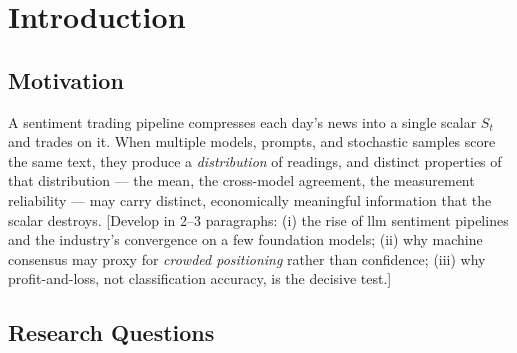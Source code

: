 %
%
%
\chapter{Introduction}
\label{ch:introduction}

\section{Motivation}
\label{sec:motivation}

A sentiment trading pipeline compresses each day's news into a single
scalar $S_t$ and trades on it. When multiple models, prompts, and
stochastic samples score the same text, they produce a
\emph{distribution} of readings, and distinct properties of that
distribution --- the mean, the cross-model agreement, the measurement
reliability --- may carry distinct, economically meaningful
information that the scalar destroys. [Develop in 2--3 paragraphs:
(i) the rise of \gls{llm} sentiment pipelines and the industry's
convergence on a few foundation models; (ii) why machine consensus may
proxy for \emph{crowded positioning} rather than confidence; (iii) why
profit-and-loss, not classification accuracy, is the decisive test.]

\section{Research Questions}
\label{sec:research-questions}

